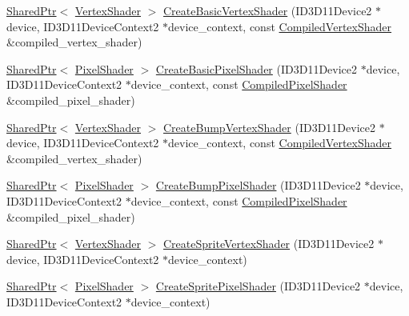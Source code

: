 \begin{DoxyCompactItemize}
\item 
\hyperlink{namespacemage_a1e01ae66713838a7a67d30e44c67703e}{Shared\+Ptr}$<$ \hyperlink{classmage_1_1_vertex_shader}{Vertex\+Shader} $>$ \hyperlink{classmage_1_1_resource_factory_af2940e4c5b3d975a9b3a69cebbfaea42}{Create\+Basic\+Vertex\+Shader} (I\+D3\+D11\+Device2 $\ast$device, I\+D3\+D11\+Device\+Context2 $\ast$device\+\_\+context, const \hyperlink{structmage_1_1_compiled_vertex_shader}{Compiled\+Vertex\+Shader} \&compiled\+\_\+vertex\+\_\+shader)
\item 
\hyperlink{namespacemage_a1e01ae66713838a7a67d30e44c67703e}{Shared\+Ptr}$<$ \hyperlink{classmage_1_1_pixel_shader}{Pixel\+Shader} $>$ \hyperlink{classmage_1_1_resource_factory_a7de0876328fdabd672cd7719f616dd0d}{Create\+Basic\+Pixel\+Shader} (I\+D3\+D11\+Device2 $\ast$device, I\+D3\+D11\+Device\+Context2 $\ast$device\+\_\+context, const \hyperlink{structmage_1_1_compiled_pixel_shader}{Compiled\+Pixel\+Shader} \&compiled\+\_\+pixel\+\_\+shader)
\item 
\hyperlink{namespacemage_a1e01ae66713838a7a67d30e44c67703e}{Shared\+Ptr}$<$ \hyperlink{classmage_1_1_vertex_shader}{Vertex\+Shader} $>$ \hyperlink{classmage_1_1_resource_factory_ab3f6757ed97e85fdbef279b5f2817b77}{Create\+Bump\+Vertex\+Shader} (I\+D3\+D11\+Device2 $\ast$device, I\+D3\+D11\+Device\+Context2 $\ast$device\+\_\+context, const \hyperlink{structmage_1_1_compiled_vertex_shader}{Compiled\+Vertex\+Shader} \&compiled\+\_\+vertex\+\_\+shader)
\item 
\hyperlink{namespacemage_a1e01ae66713838a7a67d30e44c67703e}{Shared\+Ptr}$<$ \hyperlink{classmage_1_1_pixel_shader}{Pixel\+Shader} $>$ \hyperlink{classmage_1_1_resource_factory_a4e81a4ebd39f16ac6b69e926db66c5ae}{Create\+Bump\+Pixel\+Shader} (I\+D3\+D11\+Device2 $\ast$device, I\+D3\+D11\+Device\+Context2 $\ast$device\+\_\+context, const \hyperlink{structmage_1_1_compiled_pixel_shader}{Compiled\+Pixel\+Shader} \&compiled\+\_\+pixel\+\_\+shader)
\item 
\hyperlink{namespacemage_a1e01ae66713838a7a67d30e44c67703e}{Shared\+Ptr}$<$ \hyperlink{classmage_1_1_vertex_shader}{Vertex\+Shader} $>$ \hyperlink{classmage_1_1_resource_factory_a8210187f8255c95d9c3b7b86cefd5035}{Create\+Sprite\+Vertex\+Shader} (I\+D3\+D11\+Device2 $\ast$device, I\+D3\+D11\+Device\+Context2 $\ast$device\+\_\+context)
\item 
\hyperlink{namespacemage_a1e01ae66713838a7a67d30e44c67703e}{Shared\+Ptr}$<$ \hyperlink{classmage_1_1_pixel_shader}{Pixel\+Shader} $>$ \hyperlink{classmage_1_1_resource_factory_a75d06c10e6d34263bc0f4e2816003e72}{Create\+Sprite\+Pixel\+Shader} (I\+D3\+D11\+Device2 $\ast$device, I\+D3\+D11\+Device\+Context2 $\ast$device\+\_\+context)

\end{DoxyCompactItemize}

